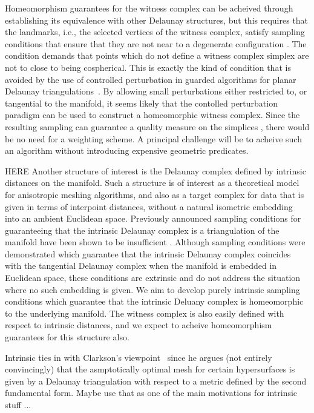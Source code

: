 Homeomorphism guarantees for the witness complex can be acheived
through establishing its equivalence with other Delaunay structures,
but this requires that the landmarks, i.e., the selected vertices of
the witness complex, satisfy sampling conditions that ensure that they
are not near to a degenerate configuration
\cite{boissonnat2011cgl,boissonnat2012stab}.  The condition demands
that points which do not define a witness complex simplex are not to
close to being cospherical. This is exactly the kind of condition that
is avoided by the use of controlled perturbation in guarded algorithms
for planar Delaunay triangulations~\cite{funke2005cp}. By allowing
small perturbations either restricted to, or tangential to the
manifold, it seems likely that the contolled perturbation paradigm can
be used to construct a homeomorphic witness complex. Since the
resulting sampling can guarantee a quality measure on the simplices
\cite{boissonnat2012stab}, there would be no need for a weighting
scheme.  A principal challenge will be to acheive such an algorithm
without introducing expensive geometric predicates.


HERE
Another structure of interest is the Delaunay complex defined by
intrinsic distances on the manifold. Such a structure is of interest
as a theoretical model for anisotropic meshing algorithms, and also as
a target complex for data that is given in terms of interpoint
distances, without a natural isometric embedding into an ambient
Euclidean space. Previously announced sampling conditions
\cite{leibon2000} for guaranteeing that the intrinsic Delaunay complex
is a triangulation of the manifold have been shown to be insufficient
\cite{boissonnat2012stab}. Although sampling conditions were
demonstrated which guarantee that the intrinsic Delaunay complex
coincides with the tangential Delaunay complex when the manifold is
embedded in Euclidean space, these conditions are extrinsic and do not
address the situation where no such embedding is given. We aim to
develop purely intrinsic sampling conditions which guarantee that the
intrinsic Deluany complex is homeomorphic to the underlying
manifold. The witness complex is also easily defined with respect to
intrinsic distances, and we expect to acheive homeomorphism guarantees
for this structure also.

Intrinsic ties in with Clarkson's viewpoint~\cite{clarkson2006} since
he argues (not entirely convincingly) that the asmptotically optimal
mesh for certain hypersurfaces is given by a Delaunay triangulation
with respect to a metric defined by the second fundamental form. Maybe
use that as one of the main motivations for intrinsic stuff ...




